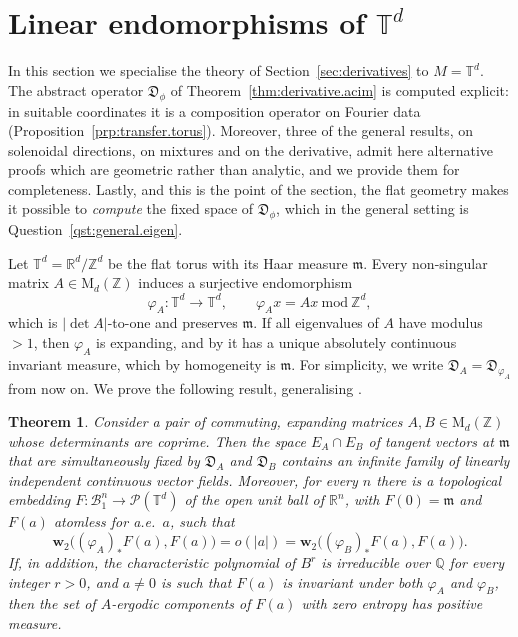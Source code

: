 \documentclass[11pt,reqno]{amsart}
\theoremstyle{plain}
\newtheorem{thm}{Theorem}[section]
\theoremstyle{definition}
\newcommand{\dw}{\mathbf{w}_2}
\newcommand{\T}{\mathbb{T}}
\newcommand{\Z}{\mathbb{Z}}
\newcommand{\Q}{\mathbb{Q}}
\newcommand{\R}{\mathbb{R}}
\newcommand{\Leb}{\mathfrak{m}}
\newcommand{\D}{\mathfrak{D}}
\newcommand{\lto}{\longrightarrow}
\newcommand{\Prob}{\mathcal{P}}
\begin{document}
    
\section{Linear endomorphisms of \texorpdfstring{\(\T^d\)}{Td}}
    \label{sec:torus}
In this section we specialise the theory of Section~\ref{sec:derivatives} to
\( M=\T^d \).
The abstract operator \( \D_\phi \) of Theorem~\ref{thm:derivative.acim} is computed explicit: in suitable coordinates it is a composition operator on Fourier data (Proposition~\ref{prp:transfer.torus}).
Moreover, three of the general results, on solenoidal directions, on mixtures and on the derivative, admit here alternative proofs which are geometric rather than analytic, and we provide them for completeness.
Lastly, and this is the point of the section, the flat geometry makes it possible to \emph{compute} the fixed space of \( \D_\phi \), which in the general setting is Question~\ref{qst:general.eigen}.

Let \( \T^d=\R^d/\Z^d \) be the flat torus with its Haar measure \( \Leb \).
Every non-singular matrix \( A\in \mathrm{M}_d(\Z) \) induces a surjective endomorphism
\[
    \varphi_A:\T^d\lto\T^d,\qquad \varphi_Ax=Ax\ \mathrm{mod}\ \Z^d,
\]
which is \(\lvert \det A \rvert\)-to-one and preserves \( \Leb \).
If all eigenvalues of \( A \) have modulus \( >1 \), then \( \varphi_A \) is expanding, and by \cite{krzyzewski_invariant_1969} it has a unique absolutely continuous invariant measure, which by homogeneity is \( \Leb \).
For simplicity, we write \( \D_A = \D_{\varphi_A} \) from now on.
We prove the following result, generalising \cite[Theorem 1.7]{kloeckner_optimal_2013_preprint}.

\begin{thm}\label{thm:main.application}
    Consider a pair of commuting, expanding matrices \( A,B\in \mathrm{M}_d(\Z) \)  whose determinants are coprime.
    Then the space \( E_A\cap E_B \) of tangent vectors at \( \Leb \) that are simultaneously fixed by \( \D_A\) and \( \D_B\) contains an infinite family of linearly independent continuous vector fields.
    Moreover, for every \( n \) there is a topological embedding \( F:\mathcal B^n_1\to\Prob(\T^d) \) of the open unit ball of \( \R^n \), with \( F(0)=\Leb \) and \( F(a) \) atomless for a.e.\ \( a \), such that
    \[
        \dw\big(( \varphi_A )_\ast F(a),F(a)\big)=o(\lvert a \rvert) = \dw\big(( \varphi_B )_\ast F(a),F(a)\big).
    \]
    If, in addition, the characteristic polynomial of \(B^{r}\) is irreducible over \(\Q\) for every integer \(r>0\), and \(a\neq0\) is such that \(F(a)\) is invariant under both \(\varphi_A\) and \(\varphi_B\), then the set of \(A\)-ergodic components of \(F(a)\) with zero entropy has positive measure.
\end{thm}
\end{document}
